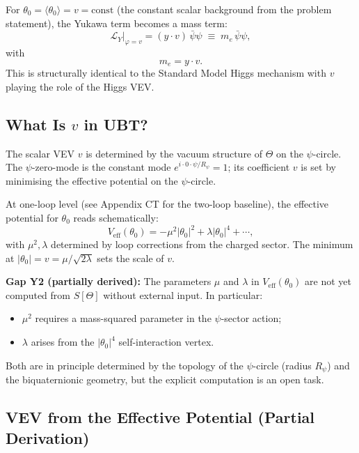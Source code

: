 \documentclass[12pt]{article}
\theoremstyle{definition}
\theoremstyle{remark}
\begin{document}
For $\theta_0 = \langle\theta_0\rangle = v = \mathrm{const}$ (the constant scalar background
from the problem statement), the Yukawa term becomes a mass term:
\begin{equation}
  \mathcal{L}_Y\big|_{\varphi=v} = (y\cdot v)\,\bar\psi\psi \;\equiv\; m_e\,\bar\psi\psi,
\end{equation}
with
\begin{equation}
  \boxed{m_e = y\cdot v.}
\end{equation}
This is structurally identical to the Standard Model Higgs mechanism with $v$ playing the
role of the Higgs VEV.

\subsection{What Is $v$ in UBT?}

The scalar VEV $v$ is determined by the vacuum structure of $\Theta$ on the $\psi$-circle.
The $\psi$-zero-mode is the constant mode $e^{i\cdot0\cdot\psi/R_\psi} = 1$; its
coefficient $v$ is set by minimising the effective potential on the $\psi$-circle.

At one-loop level (see Appendix CT for the two-loop baseline), the effective potential
for $\theta_0$ reads schematically:
\begin{equation}
  V_\mathrm{eff}(\theta_0)
  = -\mu^2|\theta_0|^2 + \lambda|\theta_0|^4 + \cdots,
\end{equation}
with $\mu^2, \lambda$ determined by loop corrections from the charged sector.  The
minimum at $|\theta_0| = v = \mu/\sqrt{2\lambda}$ sets the scale of $v$.

\begin{gapbox}
\textbf{Gap Y2 (partially derived):} The parameters $\mu$ and $\lambda$ in $V_\mathrm{eff}(\theta_0)$
are not yet computed from $S[\Theta]$ without external input.  In particular:
\begin{itemize}
  \item $\mu^2$ requires a mass-squared parameter in the $\psi$-sector action;
  \item $\lambda$ arises from the $|\theta_0|^4$ self-interaction vertex.
\end{itemize}
Both are in principle determined by the topology of the $\psi$-circle (radius $R_\psi$)
and the biquaternionic geometry, but the explicit computation is an open task.
\end{gapbox}

\subsection{VEV from the Effective Potential (Partial Derivation)}
\label{subsec:vev_partial}
\end{document}
